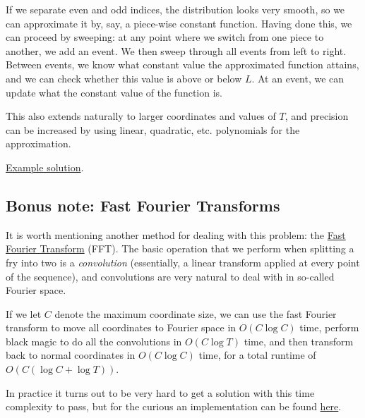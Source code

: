 \documentclass{article}
\begin{document}
If we separate even and odd indices, the distribution looks very smooth, so we can approximate it by, say, a piece-wise constant function.
Having done this, we can proceed by sweeping: at any point where we switch from one piece to another, we add an event.
We then sweep through all events from left to right.
Between events, we know what constant value the approximated function attains,
and we can check whether this value is above or below $L$.
At an event, we can update what the constant value of the function is.

This also extends naturally to larger coordinates and values of $T$, and precision can be increased by
using linear, quadratic, etc. polynomials for the approximation.

\href{https://github.com/nordicolympiad/nordic-olympiad-2018/blob/master/tasks/fries/submissions/accepted/approximate_mw.cpp}{Example solution}.

\subsection*{Bonus note: Fast Fourier Transforms}
It is worth mentioning another method for dealing with this problem: the \href{https://en.wikipedia.org/wiki/Fast_Fourier_transform}{Fast Fourier Transform} (FFT).
The basic operation that we perform when splitting a fry into two is a \emph{convolution} (essentially, a linear transform
applied at every point of the sequence), and convolutions are very natural to deal with in so-called Fourier space.

If we let $C$ denote the maximum coordinate size, we can use the fast Fourier transform to move all coordinates to Fourier space
in $O(C \log C)$ time, perform black magic to do all the convolutions in $O(C \log T)$ time, and then transform back to normal coordinates
in $O(C \log C)$ time, for a total runtime of $O(C (\log C + \log T))$.

In practice it turns out to be very hard to get a solution with this time complexity to pass, but for the curious an
implementation can be found \href{https://github.com/nordicolympiad/nordic-olympiad-2018/blob/master/tasks/fries/submissions/fft_sl.cpp}{here}.
\end{document}
